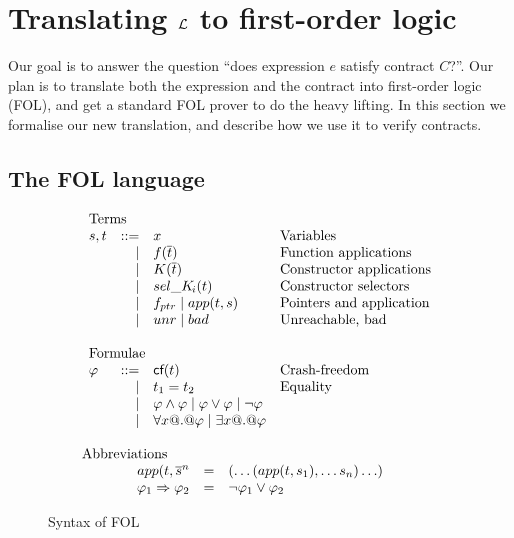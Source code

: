 \section{Translating $\cal L$ to first-order logic} \label{ssect:denot-fol}

Our goal is to answer the question ``does expression $e$ satisfy
contract $C$?''.  Our plan is to translate both the expression and the
contract into first-order logic (FOL), and get a standard FOL prover
to do the heavy lifting.
In this section we formalise our new translation, and describe how we use it to
verify contracts.

\subsection{The FOL language}

\begin{figure}
\[\begin{array}{c}
\begin{array}{lrll}
\multicolumn{3}{l}{\text{Terms}} \\
  s,t & ::=  & x                          & \text{Variables} \\
      & \mid & f(\ol{t})                  & \text{Function applications} \\
      & \mid & K(\ol{t})                  & \text{Constructor applications} \\
      & \mid & \sel{K}{i}(t)              & \text{Constructor selectors} \\
      & \mid & f_{ptr} \mid app(t,s)       & \text{Pointers and application} \\
      & \mid & \unr \mid \bad             & \text{Unreachable, bad} \\ \\
\multicolumn{3}{l}{\text{Formulae}} \\
 \phi & ::=  & \lcf{t}    & \text{Crash-freedom} \\
      & \mid & t_1 = t_2  & \text{Equality} \\
      & \mid & \phi \land \phi \mid \phi \lor \phi \mid \neg \phi \\
      & \mid & \forall x @.@ \phi \mid \exists x @.@ \phi \\ \\
\end{array}
\\
\multicolumn{1}{l}{\text{Abbreviations}} \\
\begin{array}{rcl}
app(t,\oln{s}{n} & = & (\ldots(app(t,s_1),\ldots s_n)\ldots) \\
\phi_1 \Rightarrow \phi_2 & = & \neg \phi_1 \lor \phi_2
\end{array}
\end{array}\]
\caption{Syntax of FOL}\label{fig:fol-image}
\end{figure}

